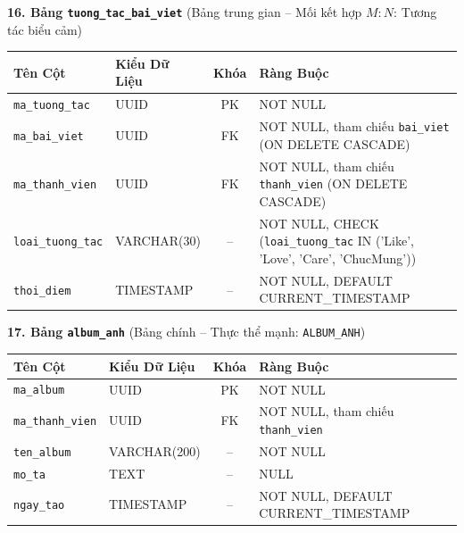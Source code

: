 \noindent\textbf{16. Bảng \texttt{tuong\_tac\_bai\_viet}} \quad (Bảng trung gian -- Mối kết hợp $M{:}N$: Tương tác biểu cảm)
\vspace{0.2cm}

\begin{center}
\small
\renewcommand{\arraystretch}{1.2}
\begin{tabular}{|p{3.8cm}|p{2.5cm}|c|p{6.5cm}|}
\hline
\textbf{Tên Cột} & \textbf{Kiểu Dữ Liệu} & \textbf{Khóa} & \textbf{Ràng Buộc} \\ \hline
\texttt{ma\_tuong\_tac} & UUID & PK & NOT NULL \\ \hline
\texttt{ma\_bai\_viet} & UUID & FK & NOT NULL, tham chiếu \texttt{bai\_viet} (ON DELETE CASCADE) \\ \hline
\texttt{ma\_thanh\_vien} & UUID & FK & NOT NULL, tham chiếu \texttt{thanh\_vien} (ON DELETE CASCADE) \\ \hline
\texttt{loai\_tuong\_tac} & VARCHAR(30) & -- & NOT NULL, CHECK (\texttt{loai\_tuong\_tac} IN ('Like', 'Love', 'Care', 'ChucMung')) \\ \hline
\texttt{thoi\_diem} & TIMESTAMP & -- & NOT NULL, DEFAULT CURRENT\_TIMESTAMP \\ \hline
\end{tabular}
\end{center}
\vspace{0.3cm}

\noindent\textbf{17. Bảng \texttt{album\_anh}} \quad (Bảng chính -- Thực thể mạnh: \texttt{ALBUM\_ANH})
\vspace{0.2cm}

\begin{center}
\small
\renewcommand{\arraystretch}{1.2}
\begin{tabular}{|p{3.8cm}|p{2.5cm}|c|p{6.5cm}|}
\hline
\textbf{Tên Cột} & \textbf{Kiểu Dữ Liệu} & \textbf{Khóa} & \textbf{Ràng Buộc} \\ \hline
\texttt{ma\_album} & UUID & PK & NOT NULL \\ \hline
\texttt{ma\_thanh\_vien} & UUID & FK & NOT NULL, tham chiếu \texttt{thanh\_vien} \\ \hline
\texttt{ten\_album} & VARCHAR(200) & -- & NOT NULL \\ \hline
\texttt{mo\_ta} & TEXT & -- & NULL \\ \hline
\texttt{ngay\_tao} & TIMESTAMP & -- & NOT NULL, DEFAULT CURRENT\_TIMESTAMP \\ \hline
\end{tabular}
\end{center}
\vspace{0.3cm}

